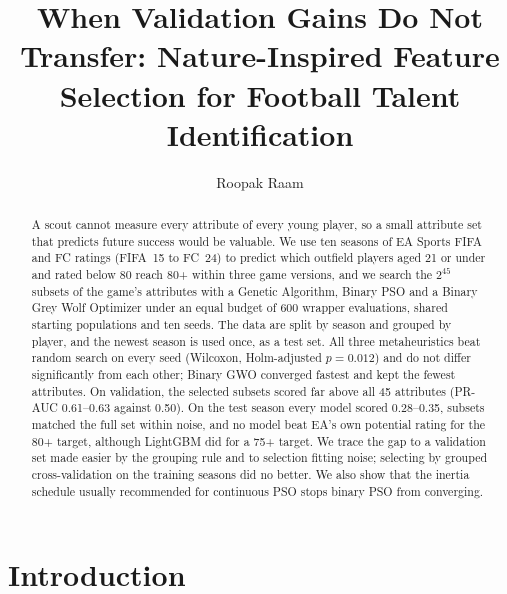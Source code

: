 \documentclass[runningheads]{llncs}
\begin{document}
\title{When Validation Gains Do Not Transfer: Nature-Inspired Feature Selection for Football Talent Identification}

\author{Roopak Raam}

\maketitle

\begin{abstract}
A scout cannot measure every attribute of every young player, so a small attribute set that predicts future success would be valuable. We use ten seasons of EA Sports FIFA and FC ratings (FIFA~15 to FC~24) to predict which outfield players aged 21 or under and rated below 80 reach 80+ within three game versions, and we search the $2^{45}$ subsets of the game's attributes with a Genetic Algorithm, Binary PSO and a Binary Grey Wolf Optimizer under an equal budget of 600 wrapper evaluations, shared starting populations and ten seeds. The data are split by season and grouped by player, and the newest season is used once, as a test set. All three metaheuristics beat random search on every seed (Wilcoxon, Holm-adjusted $p = 0.012$) and do not differ significantly from each other; Binary GWO converged fastest and kept the fewest attributes. On validation, the selected subsets scored far above all 45 attributes (PR-AUC 0.61--0.63 against 0.50). On the test season every model scored 0.28--0.35, subsets matched the full set within noise, and no model beat EA's own potential rating for the 80+ target, although LightGBM did for a 75+ target. We trace the gap to a validation set made easier by the grouping rule and to selection fitting noise; selecting by grouped cross-validation on the training seasons did no better. We also show that the inertia schedule usually recommended for continuous PSO stops binary PSO from converging.

\end{abstract}

\section{Introduction}
\end{document}
